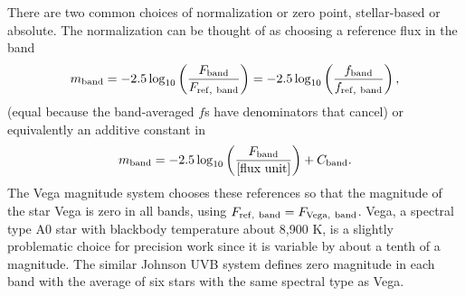 There are two common choices of normalization or zero point, stellar-based or absolute.  The normalization can be thought of as choosing a reference flux in the band
\begin{equation}
  m_{\rm band} = -2.5 \log_{10} \left( \frac{ F_{\rm band}}{F_{{\rm ref},\ \rm band}} \right) = -2.5 \log_{10} \left( \frac{ f_{\rm band}}{f_{{\rm ref},\ \rm band}} \right) ,
  \label{eqn:reference_flux}
\end{equation}
(equal because the band-averaged $f$s have denominators that cancel) or equivalently an additive constant in
\begin{equation}
  m_{\rm band} = -2.5 \log_{10} \left( \frac{ F_{\rm band}}{[\mbox{flux unit}]} \right)  + C_{\rm band}.
\end{equation}
The Vega magnitude system chooses these references so that the magnitude of the star Vega is zero in all bands, using $F_{{\rm ref},\ \rm band} = F_{{\rm Vega},\ \rm band}$.  Vega, a spectral type A0 star with blackbody temperature about 8,900 K, is a slightly problematic choice for precision work since it is variable by about a tenth of a magnitude.  The similar Johnson UVB system defines zero magnitude in each band with the average of six stars with the same spectral type as Vega.

